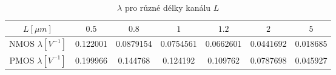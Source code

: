 \begin{table}[H]
    \centering
    \begin{tabular}{|c|c|c|c|c|c|c|}
        \hline
        \(L [\mu m]\)               & \(0.5\)    & \(0.8\)   & \(1\)     & \(1.2\)   & \(2\)     & \(5\)     \\ \hline
        NMOS \(\lambda [V^{-1}]\)   & 0.122001   & 0.0879154 & 0.0754561 & 0.0662601 & 0.0441692 & 0.018685  \\ \hline  
        PMOS \(\lambda [V^{-1}]\)   & 0.199966   & 0.144768  & 0.124192  & 0.109762  & 0.0787698 & 0.045927 \\ \hline  
    \end{tabular}
    \caption{\(\lambda\) pro různé délky kanálu \(L\)}
    \label{tab:bulkEfekt}
\end{table}